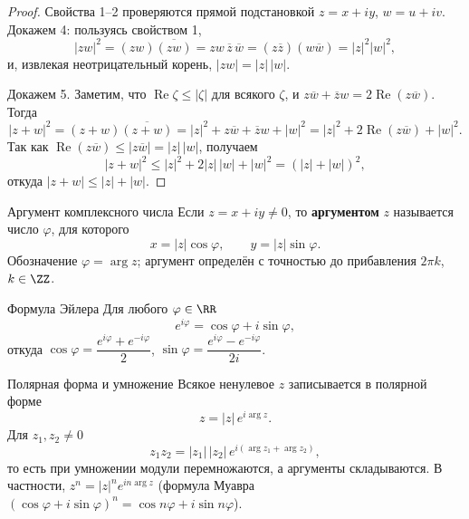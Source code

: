 \begin{proof}
	Свойства 1--2 проверяются прямой подстановкой $z = x + iy$, $w = u + iv$. 
	Докажем 4: пользуясь свойством 1,
	\[
	|zw|^2 = (zw)\overline{(zw)} = z w\,\overline{z}\,\overline{w} = (z\overline{z})(w\overline{w}) = |z|^2 |w|^2,
	\]
	и, извлекая неотрицательный корень, $|zw| = |z|\,|w|$.

	Докажем 5. Заметим, что $\operatorname{Re}\zeta \le |\zeta|$ для всякого $\zeta$, и $z\overline{w} + \overline{z}w = 2\operatorname{Re}(z\overline{w})$. Тогда
	\[
	|z + w|^2 = (z + w)\overline{(z + w)} = |z|^2 + z\overline{w} + \overline{z}w + |w|^2 = |z|^2 + 2\operatorname{Re}(z\overline{w}) + |w|^2.
	\]
	Так как $\operatorname{Re}(z\overline{w}) \le |z\overline{w}| = |z|\,|w|$, получаем
	\[
	|z + w|^2 \le |z|^2 + 2|z|\,|w| + |w|^2 = (|z| + |w|)^2,
	\]
	откуда $|z + w| \le |z| + |w|$.
\end{proof}

\begin{Definition}{Аргумент комплексного числа}{}
	Если $z = x + iy \neq 0$, то \textbf{аргументом} $z$ называется число $\varphi$, для которого
	\[
	x = |z|\cos\varphi, \qquad y = |z|\sin\varphi.
	\]
	Обозначение $\varphi = \arg z$; аргумент определён с точностью до прибавления $2\pi k$, $k \in \ZZ$.
\end{Definition}

\begin{Statement}{Формула Эйлера}{}
	Для любого $\varphi \in \RR$
	\[
	e^{i\varphi} = \cos\varphi + i\sin\varphi,
	\]
	откуда $\cos\varphi = \dfrac{e^{i\varphi} + e^{-i\varphi}}{2}$, \quad $\sin\varphi = \dfrac{e^{i\varphi} - e^{-i\varphi}}{2i}$.
\end{Statement}

\begin{Remark}{Полярная форма и умножение}{}
	Всякое ненулевое $z$ записывается в полярной форме
	\[
	z = |z|\,e^{i\arg z}.
	\]
	Для $z_1, z_2 \neq 0$
	\[
	z_1 z_2 = |z_1|\,|z_2|\,e^{i(\arg z_1 + \arg z_2)},
	\]
	то есть при умножении модули перемножаются, а аргументы складываются. В частности, $z^n = |z|^n e^{in\arg z}$ (формула Муавра $(\cos\varphi + i\sin\varphi)^n = \cos n\varphi + i\sin n\varphi$).
\end{Remark}
